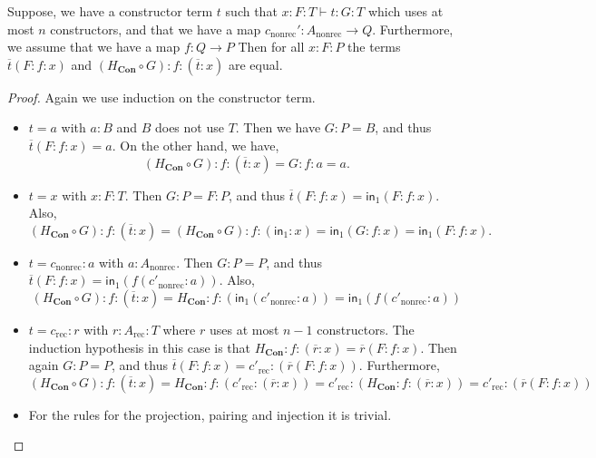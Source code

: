 \documentclass[a4paper,UKenglish]{lipics-v2016}
\newcommand{\Boperator}[1]{\mathsf{#1}}
\newcommand{\inn}{\Boperator{in}}
\newcommand{\rec}[0]{\operatorname{rec}}
\newcommand{\nonrec}[0]{\operatorname{nonrec}}
\newcommand{\Con}[0]{\textbf{Con}}
\begin{document}
\begin{lemma}
\label{lem:constrCoh}
Suppose, we have a constructor term $t$ such that $x : F : T \vdash t : G : T$ which uses at most $n$ constructors, and that we have a map $c_{\nonrec}' : A_{\nonrec} \rightarrow Q$.
Furthermore, we assume that we have a map $f : Q \rightarrow P$
Then for all $x : F : P$ the terms $\overline{t}(F : f : x)$ and $(H_{\Con} \circ G) : f : (\overline{t} : x)$ are equal.
\end{lemma}

\begin{proof}
Again we use induction on the constructor term.
\begin{itemize}
        \item $t = a$ with $a : B$ and $B$ does not use $T$. 
        Then we have $G : P = B$, and thus 
        $
        \overline{t}(F : f : x) = a.
        $
        On the other hand, we have, 
        \[
        (H_{\Con} \circ G) : f : (\overline{t} : x) = G : f : a = a.
        \]
        \item $t = x$ with $x : F : T$. 
        Then $G : P = F : P$, and thus
        $
        \overline{t}(F : f : x) = \inn_1(F : f : x).
        $
        Also,
        \[
        (H_{\Con} \circ G) : f : (\overline{t} : x) = (H_{\Con} \circ G) : f : (\inn_1 : x) = \inn_1(G : f : x) = \inn_1(F : f : x).
        \]
        \item $t = c_{\nonrec} : a$ with $a : A_{\nonrec}$. 
        Then $G : P = P$, and thus
        $
        \overline{t}(F : f : x) = \inn_1(f(c'_{\nonrec} : a))
        $.
        Also,
        \[
        (H_{\Con} \circ G) : f : (\overline{t} : x) = H_{\Con} : f : (\inn_1(c'_{\nonrec} : a)) = \inn_1(f(c'_{\nonrec} : a))
        \]
        \item $t = c_{\rec} : r$ with $r : A_{\rec} : T$ where $r$ uses at most $n-1$ constructors. 
        The induction hypothesis in this case is that $H_{\Con} : f : (\overline{r} : x) = \overline{r}(F : f : x)$.
        Then again $G : P = P$, and thus
        $
        \overline{t}(F : f : x) = c'_{\rec} : (\overline{r}(F : f : x))
        $.
        Furthermore,
        \[
        (H_{\Con} \circ G) : f : (\overline{t} : x) = H_{\Con} : f : (c'_{\rec} : (\overline{r} : x)) = c'_{\rec} : (H_{\Con} : f : (\overline{r} : x)) = c'_{\rec} : (\overline{r}(F : f : x))
        \]
        \item For the rules for the projection, pairing and injection it is trivial. \qedhere
\end{itemize}
\end{proof}
\end{document}
